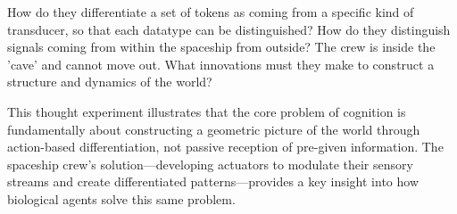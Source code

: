 How do they differentiate a set of tokens as coming from a specific kind of transducer, so that each datatype can be distinguished? How do they distinguish signals coming from within the spaceship from outside? The crew is inside the 'cave' and cannot move out. What innovations must they make to construct a structure and dynamics of the world?

This thought experiment illustrates that the core problem of cognition is fundamentally about constructing a geometric picture of the world through action-based differentiation, not passive reception of pre-given information. The spaceship crew's solution—developing actuators to modulate their sensory streams and create differentiated patterns—provides a key insight into how biological agents solve this same problem.
